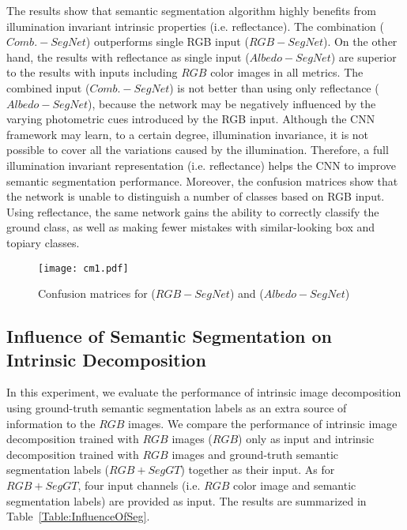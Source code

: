 \documentclass[runningheads]{llncs}
\begin{document}
\noindent The results show that semantic segmentation algorithm highly benefits from illumination invariant intrinsic properties (i.e. reflectance). The combination ($Comb.-SegNet$) outperforms single RGB input ($RGB-SegNet$). On the other hand, the results with reflectance as single input ($Albedo-SegNet$) are superior to the results with inputs including $RGB$ color images in all metrics. The combined input ($Comb.-SegNet$) is not better than using only reflectance ($Albedo-SegNet$), because the network may be negatively influenced by the varying photometric cues introduced by the RGB input. Although the CNN framework may learn, to a certain degree, illumination invariance, it is not possible to cover all the variations caused by the illumination. Therefore, a full illumination invariant representation (i.e. reflectance) helps the CNN to improve semantic segmentation performance. Moreover, the confusion matrices show that the network is unable to distinguish a number of classes based on RGB input. Using reflectance, the same network gains the ability to correctly classify the ground class, as well as making fewer mistakes with similar-looking box and topiary classes.

\begin{figure}[t]
    \centering
    \texttt{[image: cm1.pdf]}
    \caption{Confusion matrices for ($RGB-SegNet$) and ($Albedo-SegNet$)}
    \label{fig:cm1}
\end{figure}

\subsection{Influence of Semantic Segmentation on Intrinsic Decomposition}
In this experiment, we evaluate the performance of intrinsic image decomposition using ground-truth semantic segmentation labels as an extra source of information to the $RGB$ images. We compare the performance of intrinsic image decomposition trained with $RGB$ images ($RGB$) only as input and intrinsic decomposition trained with $RGB$ images and ground-truth semantic segmentation labels ($RGB+SegGT$) together as their input. As for $RGB+SegGT$, four input channels (i.e. $RGB$ color image and semantic segmentation labels) are provided as input. The results are summarized in Table~\ref{Table:InfluenceOfSeg}.
\end{document}

